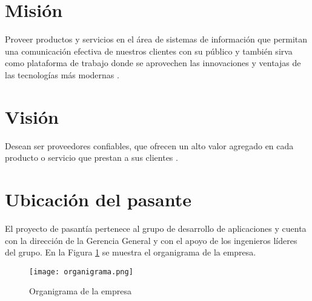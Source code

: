 \section{Misión}
Proveer productos y servicios en el área de sistemas de información que permitan una comunicación efectiva de nuestros clientes con su público y también sirva como plataforma de trabajo donde se aprovechen las innovaciones y ventajas de las tecnologías más modernas \cite{ikelsAbout}.

\section{Visión}
Desean ser proveedores confiables, que ofrecen un alto valor agregado en cada producto o servicio que prestan a sus clientes \cite{ikelsAbout}.

\section{Ubicación del pasante}
El proyecto de pasantía pertenece al grupo de desarrollo de aplicaciones y cuenta con la dirección de la Gerencia General y con el apoyo de los ingenieros líderes del grupo. En la Figura \ref{fig:organigrama} se muestra el organigrama de la empresa.

\begin{figure}[H]
\centering
    \texttt{[image: organigrama.png]}
    \caption{Organigrama de la empresa}
    \label{fig:organigrama}
\end{figure}